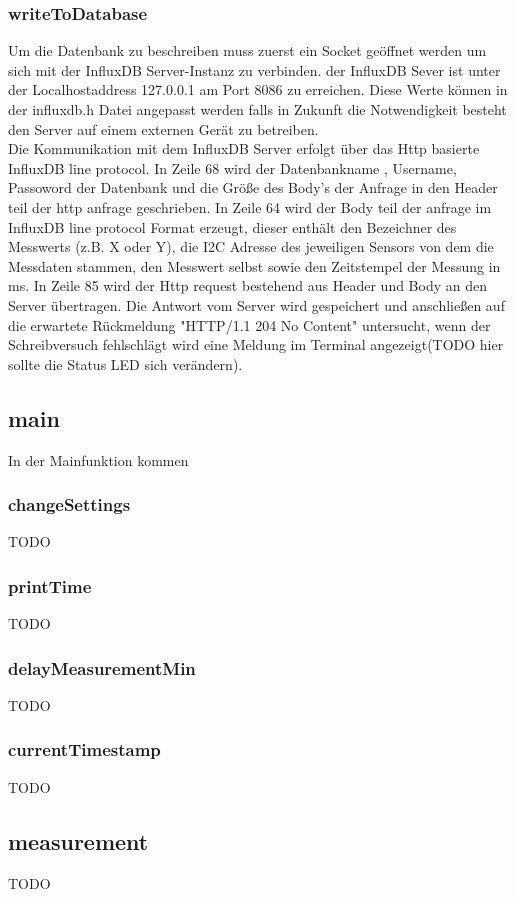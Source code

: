\subsubsection{writeToDatabase}
Um die Datenbank zu beschreiben muss zuerst ein Socket geöffnet werden um sich mit der InfluxDB Server-Instanz  zu verbinden.
der InfluxDB Sever ist unter der Localhostaddress 127.0.0.1 am Port 8086 zu erreichen.
	Diese Werte können in der influxdb.h Datei angepasst werden falls in Zukunft die Notwendigkeit besteht den Server auf einem externen Gerät zu betreiben.\\
Die Kommunikation mit dem InfluxDB Server erfolgt über das Http basierte InfluxDB line protocol.
In Zeile 68 wird der Datenbankname , Username,  Passoword der Datenbank und die Größe des Body's der Anfrage in den Header teil der http anfrage geschrieben.
In Zeile 64 wird der Body teil der anfrage im InfluxDB line protocol Format erzeugt, dieser enthält den Bezeichner des Messwerts (z.B. X oder Y), die I2C Adresse des jeweiligen Sensors von dem die Messdaten stammen, den Messwert selbst sowie den Zeitstempel der Messung in ms.	
In Zeile 85 wird der Http request bestehend aus Header und Body an den Server übertragen.
Die Antwort vom Server wird gespeichert und anschließen auf die erwartete Rückmeldung "HTTP/1.1 204 No Content" untersucht, wenn der Schreibversuch fehlschlägt wird eine Meldung im Terminal angezeigt(TODO hier sollte die Status LED sich verändern).
\subsection{main}
In der Mainfunktion kommen 
\subsubsection{changeSettings}
TODO
\subsubsection{printTime}
TODO
\subsubsection{delayMeasurementMin}
TODO
\subsubsection{currentTimestamp}
TODO
\subsection{measurement}
TODO
